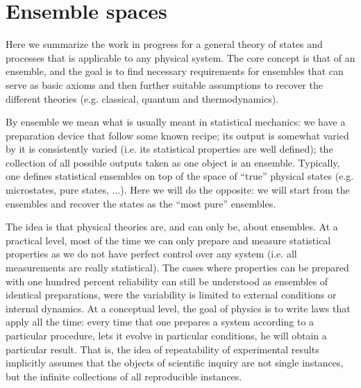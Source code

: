 
\def\>{\rangle}
\def\<{\langle}

\newcommand\mix{\mathrm{mix}}
\newcommand\component{\mathrm{comp}}
\newcommand\cospan{\mathrm{cospan}}
\newcommand\dist{\mathrm{dist}}
\newcommand\hull{\mathrm{hull}}
\newcommand\support{\mathrm{supp}}
\newcommand\capacity{\mathrm{efc}}
\newcommand\size{\mathrm{frac}}
\newcommand\fcap{\mathrm{fcap}}

\newcommand\vspan{\mathrm{span}}
\newcommand\cl{\mathrm{cl}}

\def\distinct{\downmodels}
\def\ndistinct{\ndownmodels}
\def\disjunct{\perp}

\newcommand{\ens}[1][e] {\mathsf{#1}} %
\newcommand{\Ens}[1][E] {\mathcal{#1}} %

\chapter{Ensemble spaces}

Here we summarize the work in progress for a general theory of states and processes that is applicable to any physical system. The core concept is that of an ensemble, and the goal is to find necessary requirements for ensembles that can serve as basic axioms and then further suitable assumptions to recover the different theories (e.g. classical, quantum and thermodynamics).

By ensemble we mean what is usually meant in statistical mechanics: we have a preparation device that follow some known recipe; its output is somewhat varied by it is consistently varied (i.e. its statistical properties are well defined); the collection of all possible outputs taken as one object is an ensemble. Typically, one defines statistical ensembles on top of the space of ``true'' physical states (e.g. microstates, pure states, ...). Here we will do the opposite: we will start from the ensembles and recover the states as the ``most pure'' ensembles.

The idea is that physical theories are, and can only be, about ensembles. At a practical level, most of the time we can only prepare and measure statistical properties as we do not have perfect control over any system (i.e. all measurements are really statistical). The cases where properties can be prepared with one hundred percent reliability can still be understood as ensembles of identical preparations, were the variability is limited to external conditions or internal dynamics. At a conceptual level, the goal of physics is to write laws that apply all the time: every time that one prepares a system according to a particular procedure, lets it evolve in particular conditions, he will obtain a particular result. That is, the idea of repeatability of experimental results implicitly assumes that the objects of scientific inquiry are not single instances, but the infinite collections of all reproducible instances.

